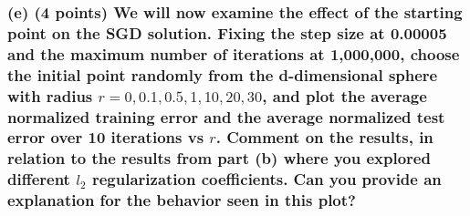 \documentclass[11pt]{article}
\begin{document}
    \subsubsection{\texorpdfstring{(e) (4 points) We will now examine the
effect of the starting point on the SGD solution. Fixing the step size
at 0.00005 and the maximum number of iterations at 1,000,000, choose the
initial point randomly from the d-dimensional sphere with radius
\(r = {0, 0.1, 0.5, 1, 10, 20, 30}\), and plot the average normalized
training error and the average normalized test error over 10 iterations
vs \(r\). Comment on the results, in relation to the results from part
(b) where you explored different \(l_2\) regularization coefficients.
Can you provide an explanation for the behavior seen in this
plot?}{(e) (4 points) We will now examine the effect of the starting point on the SGD solution. Fixing the step size at 0.00005 and the maximum number of iterations at 1,000,000, choose the initial point randomly from the d-dimensional sphere with radius r = \{0, 0.1, 0.5, 1, 10, 20, 30\}, and plot the average normalized training error and the average normalized test error over 10 iterations vs r. Comment on the results, in relation to the results from part (b) where you explored different l\_2 regularization coefficients. Can you provide an explanation for the behavior seen in this plot?}}\label{e-4-points-we-will-now-examine-the-effect-of-the-starting-point-on-the-sgd-solution.-fixing-the-step-size-at-0.00005-and-the-maximum-number-of-iterations-at-1000000-choose-the-initial-point-randomly-from-the-d-dimensional-sphere-with-radius-r-0-0.1-0.5-1-10-20-30-and-plot-the-average-normalized-training-error-and-the-average-normalized-test-error-over-10-iterations-vs-r.-comment-on-the-results-in-relation-to-the-results-from-part-b-where-you-explored-different-l_2-regularization-coefficients.-can-you-provide-an-explanation-for-the-behavior-seen-in-this-plot}
\end{document}

